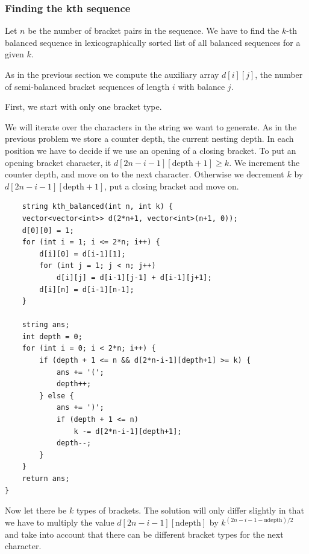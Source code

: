 \documentclass[8pt, a4paper, oneside, twocolumn]{extarticle}
\begin{document}
\subsubsection{Finding the kth sequence}
Let $n$ be the number of bracket pairs in the sequence. We have to find the $k$-th balanced sequence in lexicographically sorted list of all balanced sequences for a given $k$.

As in the previous section we compute the auxiliary array $d[i][j]$, the number of semi-balanced bracket sequences of length $i$ with balance $j$.

First, we start with only one bracket type.

We will iterate over the characters in the string we want to generate. As in the previous problem we store a counter $\text{depth}$, the current nesting depth. In each position we have to decide if we use an opening of a closing bracket. To put an opening bracket character, it $d[2n - i - 1][\text{depth}+1] \ge k$. We increment the counter $\text{depth}$, and move on to the next character. Otherwise we decrement $k$ by $d[2n - i - 1][\text{depth}+1]$, put a closing bracket and move on.
\begin{verbatim}
	string kth_balanced(int n, int k) {
    vector<vector<int>> d(2*n+1, vector<int>(n+1, 0));
    d[0][0] = 1;
    for (int i = 1; i <= 2*n; i++) {
        d[i][0] = d[i-1][1];
        for (int j = 1; j < n; j++)
            d[i][j] = d[i-1][j-1] + d[i-1][j+1];
        d[i][n] = d[i-1][n-1];
    }

    string ans;
    int depth = 0;
    for (int i = 0; i < 2*n; i++) {
        if (depth + 1 <= n && d[2*n-i-1][depth+1] >= k) {
            ans += '(';
            depth++;
        } else {
            ans += ')';
            if (depth + 1 <= n)
                k -= d[2*n-i-1][depth+1];
            depth--;
        }
    }
    return ans;
}
\end{verbatim}
Now let there be $k$ types of brackets. The solution will only differ slightly in that we have to multiply the value $d[2n-i-1][\text{ndepth}]$ by $k^{(2n-i-1-\text{ndepth})/2}$ and take into account that there can be different bracket types for the next character.
\end{document}
